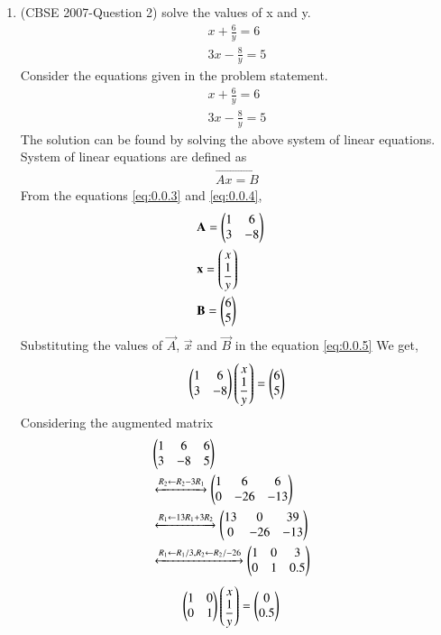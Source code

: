 \documentclass[journal,12pt,twocolumn]{IEEEtran}
\begin{document}
\begin{enumerate}
\item (CBSE 2007-Question 2)
solve the values of x and y.
\begin{align}
&x+\displaystyle\frac{6}{y}=6 & \\ 
&3x-\displaystyle\frac{8}{y}=5&
\end{align}
\solution Consider the equations  given in the problem statement.
\begin{align}
&x+\displaystyle\frac{6}{y}=6 \label{eq:0.0.3} &\\
&3x-\displaystyle\frac{8}{y}=5 \label{eq:0.0.4} &
\end{align}
The solution can be found by solving the above system of linear equations.\\ 
System of linear equations are defined as 
\begin{align}
\vec{Ax=B}\label{eq:0.0.5}
\end{align}
From the equations \eqref{eq:0.0.3} and \eqref{eq:0.0.4}, 
\begin{align}
&\vec{A}= \myvec{1 &6\\3  & -8}&\\
\medskip
&\vec{x}= \myvec{ x\\ \displaystyle\frac{1}{y}}&\\
\medskip
&\vec{B}= \myvec{6\\5} & 
\end{align} 
Substituting the values of $\vec{A}$, $\vec{x}$ and $\vec{B}$ in the equation \eqref{eq:0.0.5}
We get,
\begin{align}
\begin{pmatrix}1&6\\3&-8\end{pmatrix} \begin{pmatrix}x\\\displaystyle\frac{1}{y}\end{pmatrix}= \begin{pmatrix}6\\5\end{pmatrix}
\end{align}
Considering the augmented matrix 
 \begin{align}
  &\begin{pmatrix}1&6&6\\3&-8&5\end{pmatrix}&\\ 
& \xleftrightarrow[]{ R_2 \leftarrow R_2 - 3R_1}
  \begin{pmatrix}1&6&6\\0&-26&-13\end{pmatrix}&\\
  & \xleftrightarrow[]{ R_1 \leftarrow 13R_1 + 3R_2}
  \begin{pmatrix}13&0&39\\0&-26&-13\end{pmatrix}&\\
   & \xleftrightarrow[]{ R_1 \leftarrow R_1/3,R_2 \leftarrow R_2/-26}
  \begin{pmatrix}1&0&3\\0&1&0.5\end{pmatrix}&
 \end{align}
 \begin{align}
&\myvec{1&0\\0&1} \myvec{x\\\displaystyle\frac{1}{y}}= \myvec{0\\0.5}& \label{eq:0.0.14}

\end{align}
\end{enumerate}
\end{document}
